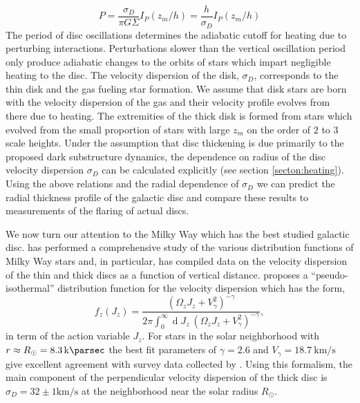 \documentclass[usenatbib]{mnras}
\renewcommand{\d}[1]{\! \mathrm{d}#1 \:}
\renewcommand{\d}[1]{\ensuremath{\operatorname{d}\!{#1}}}
\begin{document}
\begin{equation} \label{period}
P = \frac{\sigma_D}{\pi G \Sigma} I_P(z_m / h) = \frac{h}{\sigma_D} I_P(z_m / h)
\end{equation}
{ \color{red}
The period of disc oscillations determines the adiabatic cutoff for heating due to perturbing interactions. Perturbations slower than the vertical oscillation period only produce adiabatic changes to the orbits of stars which impart negligible heating to the disc. } The velocity dispersion of the disk, $\sigma_D$, corresponds to the thin disk and the gas fueling star formation. We assume that disk stars are born with the velocity dispersion of the gas and their velocity profile evolves from there due to heating. The extremities of the thick disk is formed from stars which evolved from the small proportion of stars with large $z_m$ on the order of $2$ to $3$ scale heights. Under the assumption that disc thickening is due primarily to the proposed dark substructure dynamics, the dependence on radius of the disc velocity dispersion $\sigma_D$ can be calculated explicitly {\color{red} (see section \ref{secton:heating}).} Using the above relations and the radial dependence of $\sigma_D$ we can predict the radial thickness profile of the galactic disc and compare these results to measurements of the flaring of actual discs.  
\par
We now turn our attention to the Milky Way which has the best studied galactic disc. \cite{milky_way} has performed a comprehensive study of the various distribution functions of Milky Way stars and, in particular, has compiled data on the velocity dispersion of the thin and thick discs as a function of vertical distance. \cite{milky_way} proposes a ``pseudo-isothermal'' distribution function for the velocity dispersion which has the form,
\begin{equation}
f_z(J_z) = \frac{\left( \Omega_z J_z + V_\gamma^2 \right)^{-\gamma}}{2 \pi \int_{0}^{\infty} \d{J_z} \: \left( \Omega_z J_z + V_\gamma^2 \right)^{-\gamma} },
\end{equation}  
in term of the action variable $J_z$. For stars in the solar neighborhood with $r \approx R_{\odot} =  \SI{8.3}{\kilo \parsec}$ the best fit parameters of $\gamma = 2.6$ and $V_\gamma = \SI{18.7}{\kilo \meter \per \second}$ give excellent agreement with survey data collected by \cite{milkyway-thickdisc}. Using this formalism, the main component of the perpendicular velocity dispersion of the thick disc is $\sigma_D = 32 \pm 1 \si{\kilo \meter \per \second}$ at the neighborhood near the solar radius $R_{\odot}$.   
\end{document}
